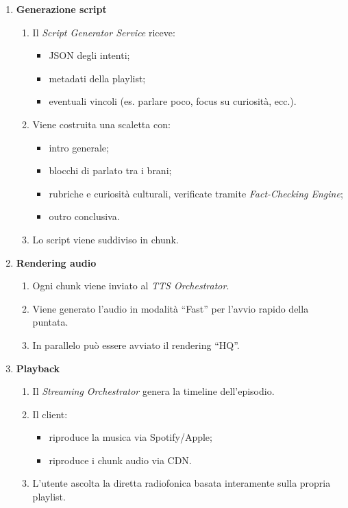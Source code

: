 \documentclass[11pt,a4paper]{article}
\begin{document}
\begin{enumerate}
    \item \textbf{Generazione script}
    \begin{enumerate}
        \item Il \textit{Script Generator Service} riceve:
        \begin{itemize}
            \item JSON degli intenti;
            \item metadati della playlist;
            \item eventuali vincoli (es. parlare poco, focus su curiosità, ecc.).
        \end{itemize}
        \item Viene costruita una scaletta con:
        \begin{itemize}
            \item intro generale;
            \item blocchi di parlato tra i brani;
            \item rubriche e curiosità culturali, verificate tramite \textit{Fact-Checking Engine};
            \item outro conclusiva.
        \end{itemize}
        \item Lo script viene suddiviso in chunk.
    \end{enumerate}

    \item \textbf{Rendering audio}
    \begin{enumerate}
        \item Ogni chunk viene inviato al \textit{TTS Orchestrator}.
        \item Viene generato l'audio in modalità ``Fast'' per l'avvio rapido della puntata.
        \item In parallelo può essere avviato il rendering ``HQ''.
    \end{enumerate}

    \item \textbf{Playback}
    \begin{enumerate}
        \item Il \textit{Streaming Orchestrator} genera la timeline dell'episodio.
        \item Il client:
        \begin{itemize}
            \item riproduce la musica via Spotify/Apple;
            \item riproduce i chunk audio via CDN.
        \end{itemize}
        \item L'utente ascolta la diretta radiofonica basata interamente sulla propria playlist.
    \end{enumerate}
\end{enumerate}
\end{document}
